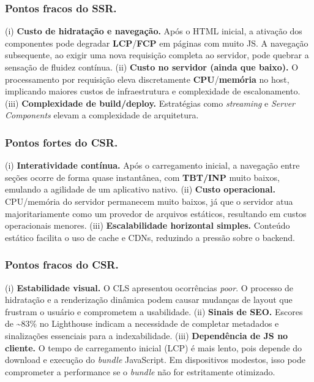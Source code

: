 \subsubsection{Pontos fracos do SSR.}
(i) \textbf{Custo de hidratação e navegação.} Após o HTML inicial, a ativação dos componentes pode degradar \textbf{LCP}/\textbf{FCP} em páginas com muito JS. A navegação subsequente, ao exigir uma nova requisição completa ao servidor, pode quebrar a sensação de fluidez contínua.
(ii) \textbf{Custo no servidor (ainda que baixo).} O processamento por requisição eleva discretamente \textbf{CPU}/\textbf{memória} no host, implicando maiores custos de infraestrutura e complexidade de escalonamento.
(iii) \textbf{Complexidade de build/deploy.} Estratégias como \emph{streaming} e \emph{Server Components} elevam a complexidade de arquitetura.

\subsubsection{Pontos fortes do CSR.}
(i) \textbf{Interatividade contínua.} Após o carregamento inicial, a navegação entre seções ocorre de forma quase instantânea, com \textbf{TBT/INP} muito baixos, emulando a agilidade de um aplicativo nativo.
(ii) \textbf{Custo operacional.} CPU/memória do servidor permanecem muito baixos, já que o servidor atua majoritariamente como um provedor de arquivos estáticos, resultando em custos operacionais menores.
(iii) \textbf{Escalabilidade horizontal simples.} Conteúdo estático facilita o uso de cache e CDNs, reduzindo a pressão sobre o backend.

\subsubsection{Pontos fracos do CSR.} 
(i) \textbf{Estabilidade visual.} O CLS apresentou ocorrências \textit{poor}. O processo de hidratação e a renderização dinâmica podem causar mudanças de layout que frustram o usuário e comprometem a usabilidade.
(ii) \textbf{Sinais de SEO.} Escores de \textasciitilde83\% no Lighthouse indicam a necessidade de completar metadados e sinalizações essenciais para a indexabilidade.
(iii) \textbf{Dependência de JS no cliente.} O tempo de carregamento inicial (LCP) é mais lento, pois depende do download e execução do \textit{bundle} JavaScript. Em dispositivos modestos, isso pode comprometer a performance se o \textit{bundle} não for estritamente otimizado.

